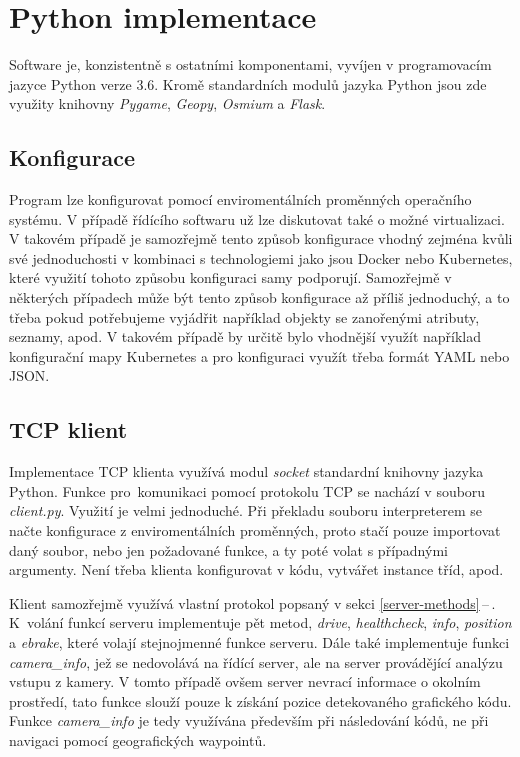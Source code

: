 \documentclass[czech, bachelor]{diploma}
\newcommand{\filipref}[1]{\ref{#1}\,--\,\nameref{#1}}
\begin{document}
\section{Python implementace}

Software je, konzistentně s ostatními komponentami, vyvíjen v programovacím jazyce Python verze 3.6. Kromě standardních modulů
jazyka Python jsou zde využity knihovny \emph{Pygame}, \emph{Geopy}, \emph{Osmium} a \emph{Flask}.

\subsection{Konfigurace}

Program lze konfigurovat pomocí enviromentálních proměnných operačního systému. V případě řídícího softwaru už lze diskutovat také
o možné virtualizaci. V takovém případě je samozřejmě tento způsob konfigurace vhodný zejména kvůli své jednoduchosti v kombinaci
s technologiemi jako jsou Docker nebo Kubernetes, které využití tohoto způsobu konfiguraci samy podporují. Samozřejmě v některých
případech může být tento způsob konfigurace až příliš jednoduchý, a to třeba pokud potřebujeme vyjádřit například objekty
se zanořenými atributy, seznamy, apod. V takovém případě by určitě bylo vhodnější využít například konfigurační mapy Kubernetes
a pro konfiguraci využít třeba formát YAML nebo JSON.

\subsection{TCP klient}

Implementace TCP klienta využívá modul \emph{socket} standardní knihovny jazyka Python. Funkce pro~komunikaci pomocí protokolu TCP
se nachází v souboru \emph{client.py}. Využití je velmi jednoduché. Při překladu souboru interpreterem se načte konfigurace
z enviromentálních proměnných, proto stačí pouze importovat daný soubor, nebo jen požadované funkce, a ty poté volat s případnými
argumenty. Není třeba klienta konfigurovat v kódu, vytvářet instance tříd, apod.

Klient samozřejmě využívá vlastní protokol popsaný v sekci \filipref{server-methods}. K~volání funkcí serveru implementuje pět
metod, \emph{drive}, \emph{healthcheck}, \emph{info}, \emph{position} a \emph{ebrake}, které volají stejnojmenné funkce serveru.
Dále také implementuje funkci \emph{camera\_info}, jež se nedovolává na řídící server, ale na server provádějící analýzu vstupu
z kamery. V tomto případě ovšem server nevrací informace o okolním prostředí, tato funkce slouží pouze k získání pozice
detekovaného grafického kódu. Funkce \emph{camera\_info} je tedy využívána především při následování kódů, ne při navigaci pomocí
geografických waypointů.
\end{document}
